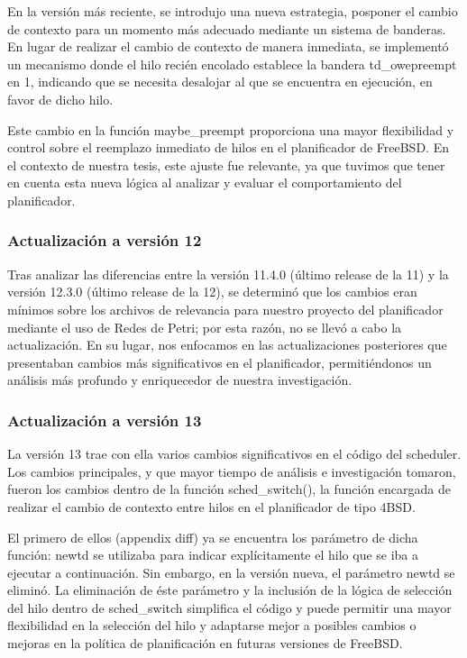 En la versión más reciente, se introdujo una nueva estrategia, posponer el cambio de contexto para un momento más adecuado mediante un sistema de banderas. En lugar de realizar el cambio de contexto de manera inmediata, se implementó un mecanismo donde el hilo recién encolado establece la bandera td\_owepreempt en 1, indicando que se necesita desalojar al que se encuentra en ejecución, en favor de dicho hilo.\par

Este cambio en la función maybe\_preempt proporciona una mayor flexibilidad y control sobre el reemplazo inmediato de hilos en el planificador de FreeBSD. En el contexto de nuestra tesis, este ajuste fue relevante, ya que tuvimos que tener en cuenta esta nueva lógica al analizar y evaluar el comportamiento del planificador.\par


\subsubsection{Actualización a versión 12}

Tras analizar las diferencias entre la versión 11.4.0 (último release de la 11) y la versión 12.3.0 (último release de la 12), se determinó que los cambios eran mínimos sobre los archivos de relevancia para nuestro proyecto del planificador mediante el uso de Redes de Petri; por esta razón, no se llevó a cabo la actualización. En su lugar, nos enfocamos en las actualizaciones posteriores que presentaban cambios más significativos en el planificador, permitiéndonos un análisis más profundo y enriquecedor de nuestra investigación.\par


\subsubsection{Actualización a versión 13}

La versión 13 trae con ella varios cambios significativos en el código del scheduler. Los cambios principales, y que mayor tiempo de análisis e investigación tomaron, fueron los cambios dentro de la función sched\_switch(), la función encargada de realizar el cambio de contexto entre hilos en el planificador de tipo 4BSD.\par

El primero de ellos (appendix diff) ya se encuentra los parámetro de dicha función: newtd se utilizaba para indicar explícitamente el hilo que se iba a ejecutar a continuación. Sin embargo, en la versión nueva, el parámetro newtd se eliminó. La eliminación de éste parámetro y la inclusión de la lógica de selección del hilo dentro de sched\_switch simplifica el código y puede permitir una mayor flexibilidad en la selección del hilo y adaptarse mejor a posibles cambios o mejoras en la política de planificación en futuras versiones de FreeBSD.\par


